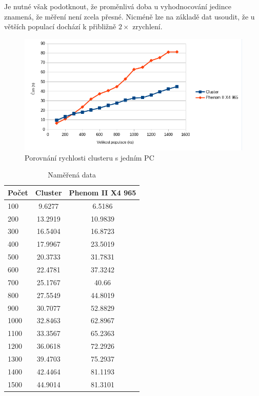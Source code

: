Je nutné však podotknout, že proměnlivá doba u vyhodnocování jedince znamená, že měření není zcela přesné. Nicméně lze na základě dat usoudit, že u větších populací dochází k přibližně $2\times$ zrychlení.

\begin{figure}[H]
	\centering
	\includegraphics[scale=0.7]{benchmarkCluster}
	\caption{Porovnání rychlosti clusteru s jedním PC}
	\label{fig:benchmarkcluster}
\end{figure}

\begin{table}[H]
	\centering
	\begin{tabular}{|l|c|c|}
		\hline
		Počet & Cluster & Phenom II X4 965 \\
		\hline
		100     & 9.6277  & 6.5186           \\
		\hline
		200     & 13.2919 & 10.9839          \\
		\hline
		300     & 16.5404 & 16.8723          \\
		\hline
		400     & 17.9967 & 23.5019          \\
		\hline
		500     & 20.3733 & 31.7831          \\
		\hline
		600     & 22.4781 & 37.3242          \\
		\hline
		700     & 25.1767 & 40.66            \\
		\hline
		800     & 27.5549 & 44.8019          \\
		\hline
		900     & 30.7077 & 52.8829          \\
		\hline
		1000    & 32.8463 & 62.8967          \\
		\hline
		1100    & 33.3567 & 65.2363          \\
		\hline
		1200    & 36.0618 & 72.2926          \\
		\hline
		1300    & 39.4703 & 75.2937          \\
		\hline
		1400    & 42.4464 & 81.1193          \\
		\hline
		1500    & 44.9014 & 81.3101          \\
		\hline
	\end{tabular}
	\caption{Naměřená data}
	\label{table:clusterBenchmark}
\end{table}

